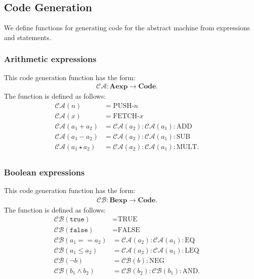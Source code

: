 \documentclass[a4paper, 12pt, twoside]{article}
\begin{document}
\vfill

\subsection{Code Generation}

We define functions for generating code for the abstract machine from
expressions and statements.

\subsubsection{Arithmetic expressions}

This code generation function has the form: \begin{gather*}
  \mathcal{CA} : \textbf{Aexp} \to \textbf{Code}.
\end{gather*} The function is defined as follows: \begin{align*}
  \mathcal{CA}(n) &= \text{PUSH-}n\\
  \mathcal{CA}(x) &= \text{FETCH-}x\\
  \mathcal{CA}(a_1 + a_2) &= \mathcal{CA}(a_2):\mathcal{CA}(a_1):\text{ADD}\\
  \mathcal{CA}(a_1 - a_2) &= \mathcal{CA}(a_2):\mathcal{CA}(a_1):\text{SUB}\\
  \mathcal{CA}(a_1 \star a_2) &= \mathcal{CA}(a_2):\mathcal{CA}(a_1):\text{MULT}.\\
\end{align*}

\subsubsection{Boolean expressions}

This code generation function has the form: \begin{gather*}
  \mathcal{CB} : \textbf{Bexp} \to \textbf{Code}.
\end{gather*} The function is defined as follows: \begin{align*}
  \mathcal{CB}(\texttt{true}) &= \text{TRUE}\\
  \mathcal{CB}(\texttt{false}) &= \text{FALSE}\\
  \mathcal{CB}(a_1 == a_2) &= \mathcal{CA}(a_2):\mathcal{CA}(a_1):\text{EQ}\\
  \mathcal{CB}(a_1 \leq a_2) &= \mathcal{CA}(a_2):\mathcal{CA}(a_1):\text{LEQ}\\
  \mathcal{CB}(\neg b) &= \mathcal{CB}(b):\text{NEG}\\
  \mathcal{CB}(b_1 \land b_2) &= \mathcal{CB}(b_2):\mathcal{CB}(b_1):\text{AND}.\\
\end{align*}
\end{document}
